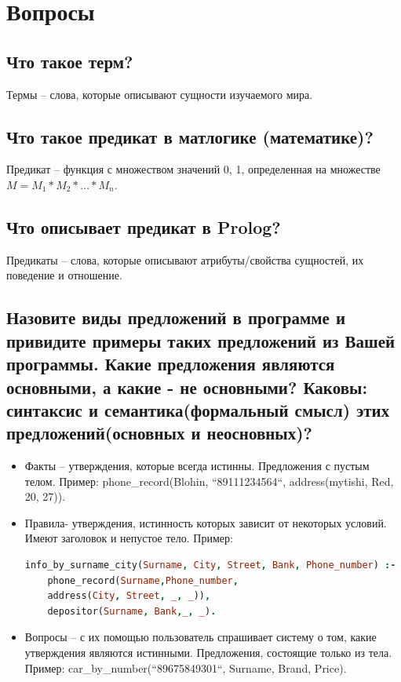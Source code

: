 \documentclass[12pt,a4paper]{article}
\begin{document}
\section{Вопросы}

\subsection{Что такое терм?}

\quad Термы – слова, которые описывают сущности изучаемого мира.

\subsection{Что такое предикат в матлогике (математике)?}

\quad Предикат – функция с множеством значений {0, 1}, определенная на множестве $M = M_1 * M_2 * … * M_n$.

\subsection{Что описывает предикат в Prolog?}
Предикаты – слова, которые описывают атрибуты/свойства сущностей, их поведение и отношение.

\subsection{Назовите виды предложений в программе и привидите примеры таких предложений из Вашей программы. Какие предложения являются основными,
а какие - не основными? Каковы: синтаксис и семантика(формальный смысл) этих предложений(основных и неосновных)?}

\begin{itemize}
	\item Факты – утверждения, которые всегда истинны. Предложения с пустым телом. Пример: phone\_record(Blohin,  ``89111234564``, address(mytishi, Red, 20, 27)).
	\item Правила- утверждения, истинность которых зависит от некоторых условий. Имеют заголовок и непустое тело. Пример:
	\begin{lstlisting}[language=Prolog]
	info_by_surname_city(Surname, City, Street, Bank, Phone_number) :-
	phone_record(Surname,Phone_number,
	address(City, Street, _, _)),
	depositor(Surname, Bank,_, _).
	\end{lstlisting}
	\item Вопросы – с их помощью пользователь спрашивает систему о том, какие утверждения являются истинными. Предложения, состоящие только из тела.
	Пример:  car\_by\_number(``89675849301``, Surname, Brand, Price).
\end{itemize}
\end{document}
